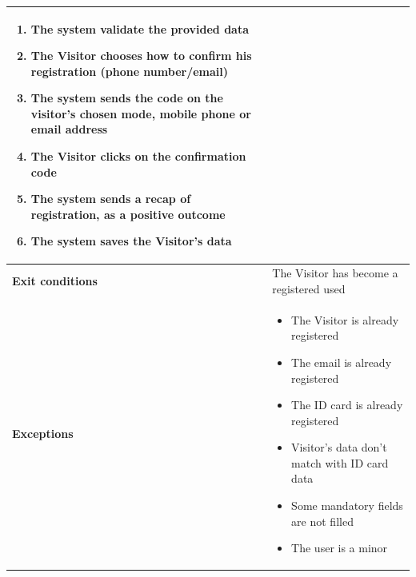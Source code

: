 \begin{description}
\begin{center}
\begin{tabular}{|p{3cm}|p{7cm}|}
\begin{enumerate}
                \item The system validate the provided data 
                \item The Visitor chooses how to confirm his registration (phone number/email) 
                \item The system sends the code on the visitor's chosen mode, mobile phone or email address
                \item The Visitor clicks on the confirmation code
                \item The system sends a recap of registration, as a positive outcome 
                \item The system saves the Visitor's data
            \end{enumerate} \\
            \hline
            \textbf{Exit conditions} & The Visitor has become a registered used \\
            \hline
            \textbf{Exceptions}
            & \begin{itemize}
                \item The Visitor is already registered
                \item The email is already registered
                \item The ID card is already registered 
                \item Visitor's data don't match with ID card data
                \item Some mandatory fields are not filled 
                \item The user is a minor
            \end{itemize} \\
            \hline
        \end{tabular}
    \end{center}
\end{description}

